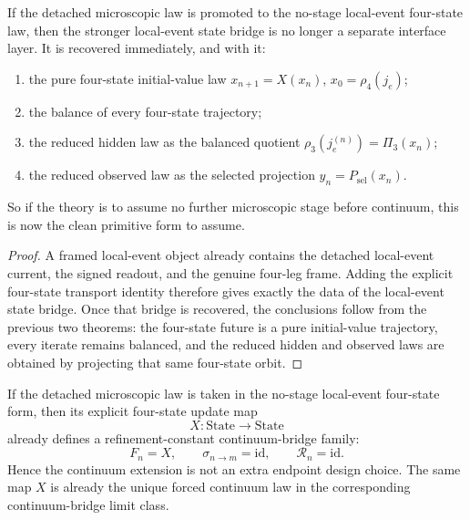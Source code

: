 \begin{theorem}
\label{thm:the-no-stage-detached-primitive-is-already-a-four-state-law}
If the detached microscopic law is promoted to the no-stage local-event
four-state law, then the stronger local-event state bridge is no longer a
separate interface layer. It is recovered immediately, and with it:
\begin{enumerate}
\item the pure four-state initial-value law
      \(x_{n+1}=X(x_n)\), \(x_0=\rho_4(j_e)\);
\item the balance of every four-state trajectory;
\item the reduced hidden law as the balanced quotient
      \(\rho_3(j_e^{(n)})=\Pi_3(x_n)\);
\item the reduced observed law as the selected projection
      \(y_n=P_{\mathrm{sel}}(x_n)\).
\end{enumerate}
So if the theory is to assume no further microscopic stage before continuum,
this is now the clean primitive form to assume.
\end{theorem}

\begin{proof}
A framed local-event object already contains the detached local-event current,
the signed readout, and the genuine four-leg frame. Adding the explicit
four-state transport identity therefore gives exactly the data of the
local-event state bridge. Once that bridge is recovered, the conclusions follow
from the previous two theorems: the four-state future is a pure initial-value
trajectory, every iterate remains balanced, and the reduced hidden and observed
laws are obtained by projecting that same four-state orbit.
\end{proof}

\begin{theorem}
\label{thm:the-no-stage-four-state-law-already-forces-a-four-state-continuum-law}
If the detached microscopic law is taken in the no-stage local-event
four-state form, then its explicit four-state update map
\[
X:\mathrm{State}\to\mathrm{State}
\]
already defines a refinement-constant continuum-bridge family:
\[
F_n = X,\qquad
\sigma_{n\to m}=\mathrm{id},\qquad
\mathcal R_n=\mathrm{id}.
\]
Hence the continuum extension is not an extra endpoint design choice. The same
map \(X\) is already the unique forced continuum law in the corresponding
continuum-bridge limit class.
\end{theorem}

